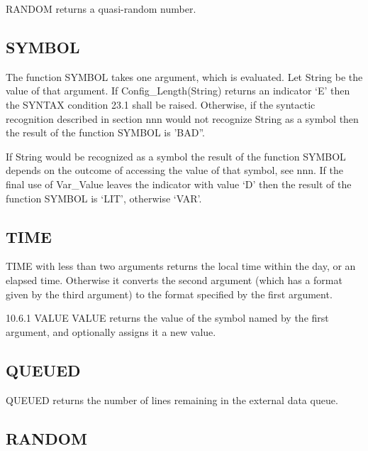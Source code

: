 RANDOM returns a quasi-random number.



\subsection{SYMBOL}\label{symbol}

The function SYMBOL takes one argument, which is evaluated. Let String
be the value of that argument. If Config\_Length(String) returns an
indicator `E' then the SYNTAX condition 23.1 shall be raised. Otherwise,
if the syntactic recognition described in section nnn would not
recognize String as a symbol then the result of the function SYMBOL is
'BAD''.

If String would be recognized as a symbol the result of the function
SYMBOL depends on the outcome of accessing the value of that symbol, see
nnn. If the final use of Var\_Value leaves the indicator with value `D'
then the result of the function SYMBOL is `LIT', otherwise `VAR'.

\subsection{TIME}\label{time}

TIME with less than two arguments returns the local time within the day,
or an elapsed time. Otherwise it converts the second argument (which has
a format given by the third argument) to the format specified by the
first argument.



10.6.1 VALUE VALUE returns the value of the symbol named by the first
argument, and optionally assigns it a new value.



\subsection{QUEUED}\label{queued-1}

QUEUED returns the number of lines remaining in the external data queue.



\subsection{RANDOM}\label{random-1}

